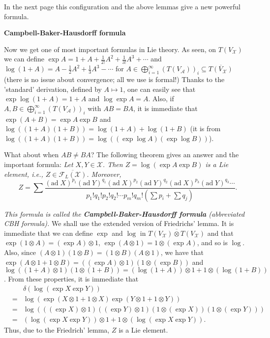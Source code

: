 \documentclass{article}
\newcommand{\ad}[1]{\mathrm{ad}\; #1}
\begin{document}
In the next page this configuration and the above lemmas give a new powerful formula.

\newpage

\textbf{Campbell-Baker-Hausdorff formula}

Now we get one of most important formulas in Lie theory.
As seen, on $T(V_\mathcal{X})$ we can define $\exp{A} = 1 + A + \frac{1}{2!} A^2 + \frac{1}{3!} A^3 + \cdots$ and $\log{(1 +A)} = A - \frac{1}{2} A^2 + \frac{1}{3} A^3 - \cdots$ for $A \in \bigoplus_{i = 1}^\infty (T(V_\mathcal{A}))_i \subseteq \overline{T(V_\mathcal{X})}$ (there is no issue about convergence; all we use is formal!)
Thanks to the 'standard' derivation, defined by $A \mapsto 1$, one can easily see that $\exp{\log{(1 + A)}} = 1 + A$ and $\log{\exp{A}} = A$.
Also, if $A, B \in \bigoplus_{i = 1}^\infty (T(V_\mathcal{A}))_i$ with $AB = BA$, it is immediate that $\exp{(A + B)} = \exp{A} \exp{B}$ and $\log{((1 + A)(1 + B))} = \log{(1 + A)} + \log{(1 + B)}$ (it is from $\log{((1 + A)(1 + B))} = \log{((\exp{\log{A}}) (\exp{\log{B}}))}$).

What about when $AB \ne BA$?
The following theorem gives an answer and the important formula: \textit{Let $X, Y \in \mathcal{X}$.
Then $Z = \log{(\exp{A} \exp{B})}$ is a Lie element, i.e., $Z \in \overline{\mathcal{F}_L(\mathcal{X})}$.
Moreover, }
\begin{displaymath}
  Z = \sum \frac{(\ad{X})^{p_1} (\ad{Y})^{q_1} (\ad{X})^{p_2} (\ad{Y})^{q_2} (\ad{X})^{p_3} (\ad{Y})^{q_3} \cdots}{p_1! q_1! p_2! q_2! \cdots p_m! q_m! (\sum p_i + \sum q_j)}.
\end{displaymath}

\textit{This formula is called the \textbf{Campbell-Baker-Hausdorff formula} (abbreviated CBH formula).}
We shall use the extended version of Friedrichs' lemma.
It is immediate that we can define $\exp$ and $\log$ in $\overline{T(V_\mathcal{X}) \otimes T(V_\mathcal{X})}$ and that $\exp{(1 \otimes A)} = (\exp{A}) \otimes 1$, $\exp{(A \otimes 1)} = 1 \otimes (\exp{A})$, and so is $\log$.
Also, since $(A \otimes 1)(1 \otimes B) = (1 \otimes B)(A \otimes 1)$, we have that $\exp{(A \otimes 1 + 1 \otimes B)} = ((\exp{A}) \otimes 1)(1 \otimes (\exp{B}))$ and $\log{((1 + A) \otimes 1)(1 \otimes (1 + B))} = (\log{(1 + A)}) \otimes 1 + 1 \otimes (\log{(1 + B)})$.
From these properties, it is immediate that
\begin{eqnarray*}
  & & \delta(\log{(\exp{X} \exp{Y})}) \\
  &=& \log{(\exp{(X \otimes 1 + 1 \otimes X)} \exp{(Y \otimes 1 + 1 \otimes Y)})} \\
  &=& \log{(((\exp{X}) \otimes 1) ((\exp{Y}) \otimes 1) (1 \otimes (\exp{X})) (1 \otimes (\exp{Y})))} \\
  &=& (\log{(\exp{X} \exp{Y})}) \otimes 1 + 1 \otimes (\log{(\exp{X} \exp{Y})}).
\end{eqnarray*}
Thus, due to the Friedrich' lemma, $Z$ is a Lie element.
\end{document}
